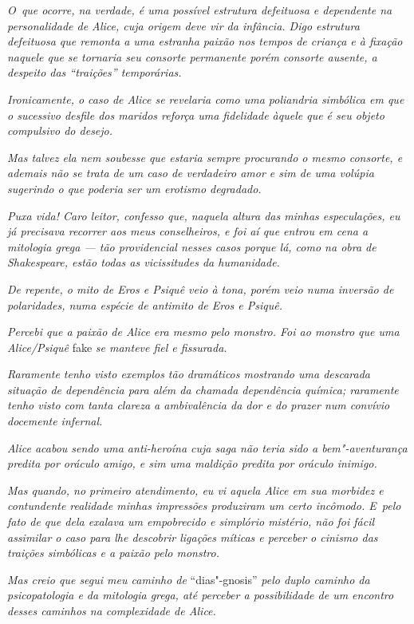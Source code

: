 \emph{O~que ocorre, na verdade, é uma possível estrutura defeituosa e
dependente na personalidade de Alice, cuja origem deve vir da infância.
Digo estrutura defeituosa que remonta a uma estranha paixão nos tempos
de criança e à fixação naquele que se tornaria seu consorte permanente
porém consorte ausente, a despeito das ``traições'' temporárias.}

\emph{Ironicamente, o caso de Alice se revelaria como uma poliandria
simbólica em que o sucessivo desfile dos maridos reforça uma fidelidade
àquele que é seu objeto compulsivo do desejo.}

\emph{Mas talvez ela nem soubesse que estaria sempre procurando o mesmo
consorte, e ademais não se trata de um caso de verdadeiro amor e sim de
uma volúpia sugerindo o que poderia ser um erotismo degradado.}

\emph{Puxa vida! Caro leitor, confesso que, naquela altura das minhas
especulações, eu já precisava recorrer aos meus conselheiros, e foi aí
que entrou em cena a mitologia grega --- tão providencial nesses casos
porque lá, como na obra de Shakespeare, estão todas as vicissitudes da
humanidade.}

\emph{De repente, o mito de Eros e Psiquê veio à tona, porém veio numa
inversão de polaridades, numa espécie de antimito de Eros e Psiquê.}

\emph{Percebi que a paixão de Alice era mesmo pelo monstro. Foi ao
monstro que uma Alice/Psiquê} fake \emph{se manteve fiel e fissurada.}

\emph{Raramente tenho visto exemplos tão dramáticos mostrando uma
descarada situação de dependência para além da chamada dependência
química; raramente tenho visto com tanta clareza a ambivalência da dor e
do prazer num convívio docemente infernal.}

\emph{Alice acabou sendo uma anti-heroína cuja saga não teria sido a
bem"-aventurança predita por oráculo amigo, e sim uma maldição predita
por oráculo inimigo.}

\emph{Mas quando, no primeiro atendimento, eu vi aquela Alice em sua
morbidez e contundente realidade minhas impressões produziram um certo
incômodo. E~pelo fato de que dela exalava um empobrecido e simplório
mistério, não foi fácil assimilar o caso para lhe descobrir ligações
míticas e perceber o cinismo das traições simbólicas e a paixão pelo
monstro.}

\emph{Mas creio que segui meu caminho de} ``dias"-gnosis'' \emph{pelo
duplo caminho da psicopatologia e da mitologia grega, até perceber a
possibilidade de um encontro desses caminhos na complexidade de Alice.}

